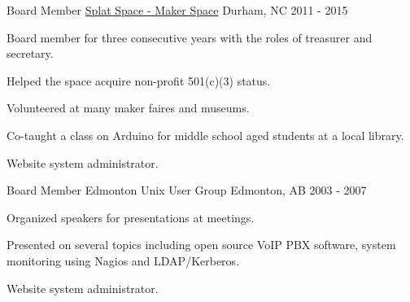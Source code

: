 

\begin{cventries}

  \cventry
    {Board Member} %
    {\href{http://splatspace.org/}{Splat Space - Maker Space}} %
    {Durham, NC} %
    {2011 - 2015} %
    {
      \begin{cvitems} %
        \item {Board member for three consecutive years with the roles of treasurer and secretary.}
        \item {Helped the space acquire non-profit 501(c)(3) status.}
        \item {Volunteered at many maker faires and museums.}
        \item {Co-taught a class on Arduino for middle school aged students at a local library.}
        \item {Website system administrator.}
      \end{cvitems}
    }

  \cventry
    {Board Member} %
    {Edmonton Unix User Group} %
    {Edmonton, AB} %
    {2003 - 2007} %
    {
      \begin{cvitems} %
        \item {Organized speakers for presentations at meetings.}
        \item {Presented on several topics including open source VoIP PBX software, system monitoring using Nagios and LDAP/Kerberos.}
        \item {Website system administrator.}
      \end{cvitems}
    }

\end{cventries}
